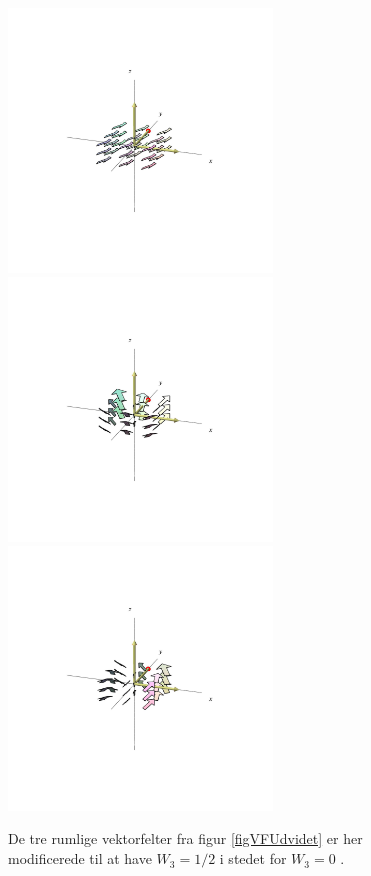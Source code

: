 \begin{figure}[ht]
\centerline{\includegraphics[height=70mm]{FIGS/plotVFUdvidet1Lift}\includegraphics[height=70mm]{FIGS/plotVFUdvidet3Lift} \includegraphics[height=70mm]{FIGS/plotVFUdvidet2Lift}}
\begin{center}
\caption{\small{De tre rumlige vektorfelter fra figur \ref{figVFUdvidet} er her modificerede til at have  $W_{3} = 1/2$ i stedet for $W_{3} = 0$ .}}
\label{figVFUdvidetLift}
\end{center}
\end{figure}




